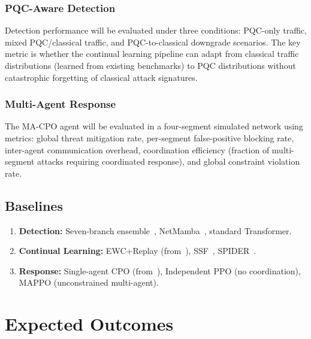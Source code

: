 \documentclass[12pt,a4paper]{article}
\theoremstyle{definition}
\begin{document}
\subsubsection{PQC-Aware Detection}
Detection performance will be evaluated under three conditions: PQC-only traffic, mixed PQC/classical traffic, and PQC-to-classical downgrade scenarios. The key metric is whether the continual learning pipeline can adapt from classical traffic distributions (learned from existing benchmarks) to PQC distributions without catastrophic forgetting of classical attack signatures.

\subsubsection{Multi-Agent Response}
The MA-CPO agent will be evaluated in a four-segment simulated network using metrics: global threat mitigation rate, per-segment false-positive blocking rate, inter-agent communication overhead, coordination efficiency (fraction of multi-segment attacks requiring coordinated response), and global constraint violation rate.

\subsection{Baselines}
\begin{enumerate}
\item \textbf{Detection:} Seven-branch ensemble~\cite{anaedevha2026stochastic}, NetMamba~\cite{wang2024netmamba}, standard Transformer.
\item \textbf{Continual Learning:} EWC+Replay (from~\cite{anaedevha2026cl_rl}), SSF~\cite{zhang2025ssf}, SPIDER~\cite{amalapuram2024spider}.
\item \textbf{Response:} Single-agent CPO (from~\cite{anaedevha2026cl_rl}), Independent PPO (no coordination), MAPPO (unconstrained multi-agent).
\end{enumerate}

\section{Expected Outcomes}
\label{sec:outcomes}
\end{document}
